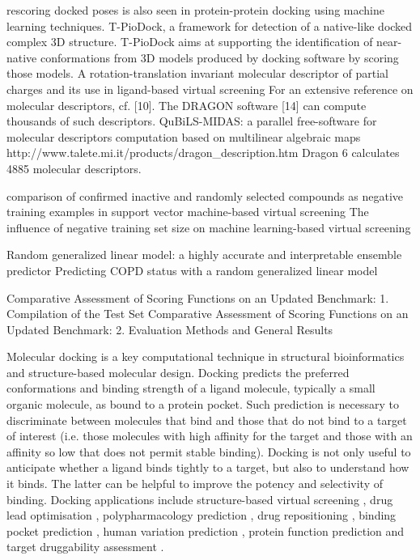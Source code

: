 \citep{1399} rescoring docked poses is also seen in protein-protein docking using machine learning techniques. T-PioDock, a framework for detection of a native-like docked complex 3D structure. T-PioDock aims at supporting the identification of near-native conformations from 3D models produced by docking software by scoring those models.
\citep{1389} A rotation-translation invariant molecular descriptor of partial charges and its use in ligand-based virtual screening
\citep{1389} For an extensive reference on molecular descriptors, cf. [10]. The DRAGON software [14] can compute thousands of such descriptors.
\citep{1400} QuBiLS-MIDAS: a parallel free-software for molecular descriptors computation based on multilinear algebraic maps
http://www.talete.mi.it/products/dragon\_description.htm Dragon 6 calculates 4885 molecular descriptors.

\citep{1423} comparison of confirmed inactive and randomly selected compounds as negative training examples in support vector machine-based virtual screening
\citep{1404} The influence of negative training set size on machine learning-based virtual screening

\citep{1377} Random generalized linear model: a highly accurate and interpretable ensemble predictor
\citep{1418} Predicting COPD status with a random generalized linear model

\citep{1426} Comparative Assessment of Scoring Functions on an Updated Benchmark: 1. Compilation of the Test Set
\citep{1411} Comparative Assessment of Scoring Functions on an Updated Benchmark: 2. Evaluation Methods and General Results

Molecular docking is a key computational technique in structural bioinformatics and structure-based molecular design. Docking predicts the preferred conformations and binding strength of a ligand molecule, typically a small organic molecule, as bound to a protein pocket. Such prediction is necessary to discriminate between molecules that bind and those that do not bind to a target of interest (i.e. those molecules with high affinity for the target and those with an affinity so low that does not permit stable binding). Docking is not only useful to anticipate whether a ligand binds tightly to a target, but also to understand how it binds. The latter can be helpful to improve the potency and selectivity of binding. Docking applications include structure-based virtual screening \citep{455,1383,1448}, drug lead optimisation \citep{1385}, polypharmacology prediction \citep{1449,1450}, drug repositioning \citep{1384}, binding pocket prediction \citep{384,1217}, human variation prediction \citep{1451}, protein function prediction \citep{1386} and target druggability assessment \citep{1472}.

